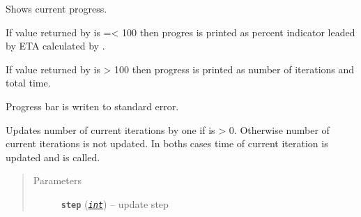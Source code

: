 \documentclass[a4paper,10pt,english]{sphinxmanual}
\begin{document}
\begin{fulllineitems}
\begin{fulllineitems}
\end{fulllineitems}


\begin{fulllineitems}
\label{aqueduct.utils.log:aqueduct.utils.log.SimpleProgressBar.show}
Shows current progress.

If value returned by {\hyperref[aqueduct.utils.log:aqueduct.utils.log.SimpleProgressBar.percent]{}} is =\textless{} 100 then progres is printed as
percent indicator leaded by ETA calculated by {\hyperref[aqueduct.utils.log:aqueduct.utils.log.SimpleProgressBar.ETA]{}}.

If value returned by {\hyperref[aqueduct.utils.log:aqueduct.utils.log.SimpleProgressBar.percent]{}} is \textgreater{} 100 then progress is printed as
number of iterations and total time.

Progress bar is writen to standard error.

\end{fulllineitems}


\begin{fulllineitems}
\label{aqueduct.utils.log:aqueduct.utils.log.SimpleProgressBar.heartbeat}
\end{fulllineitems}


\begin{fulllineitems}
\label{aqueduct.utils.log:aqueduct.utils.log.SimpleProgressBar.update}
Updates number of current iterations  by one if  is \textgreater{} 0.
Otherwise number of current iterations is not updated.
In boths cases time of current iteration  is updated and
{\hyperref[aqueduct.utils.log:aqueduct.utils.log.SimpleProgressBar.show]{}} is called.
\begin{quote}\begin{description}
\item[{Parameters}] \leavevmode
\textbf{\texttt{step}} (\href{http://docs.python.org/2/library/functions.html\#int}{\emph{\texttt{int}}}) -- update step

\end{description}\end{quote}


\end{fulllineitems}
\end{fulllineitems}
\end{document}
